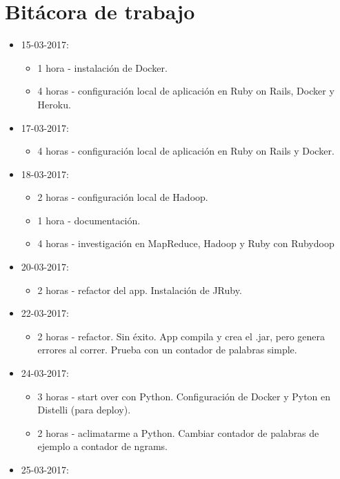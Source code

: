 \documentclass{article}
\begin{document}
\section{Bit\'acora de trabajo}
\begin{itemize}
  \item 15-03-2017:
  \begin{itemize}
    \item 1 hora - instalaci\'on de Docker.
    \item 4 horas - configuraci\'on local de aplicaci\'on en Ruby on Rails, Docker y Heroku.
  \end{itemize}
  \item 17-03-2017:
  \begin{itemize}
    \item 4 horas - configuraci\'on local de aplicaci\'on en Ruby on Rails y Docker.
  \end{itemize}
  \item 18-03-2017:
  \begin{itemize}
    \item 2 horas - configuraci\'on local de Hadoop.
    \item 1 hora - documentaci\'on.
    \item 4 horas - investigaci\'on en MapReduce, Hadoop y Ruby con Rubydoop
  \end{itemize}
  \item 20-03-2017:
  \begin{itemize}
    \item 2 horas - refactor del app. Instalaci\'on de JRuby.
  \end{itemize}
  \item 22-03-2017:
  \begin{itemize}
    \item 2 horas - refactor. Sin \'exito. App compila y crea el .jar, pero genera errores al correr. Prueba con un contador de palabras simple.
  \end{itemize}
  \item 24-03-2017:
  \begin{itemize}
    \item 3 horas - start over con Python. Configuraci\'on de Docker y Pyton en Distelli (para deploy).
    \item 2 horas - aclimatarme a Python. Cambiar contador de palabras de ejemplo a contador de ngrams.
  \end{itemize}
  \item 25-03-2017:
  \begin{itemize}

\end{itemize}
\end{itemize}
\end{document}
